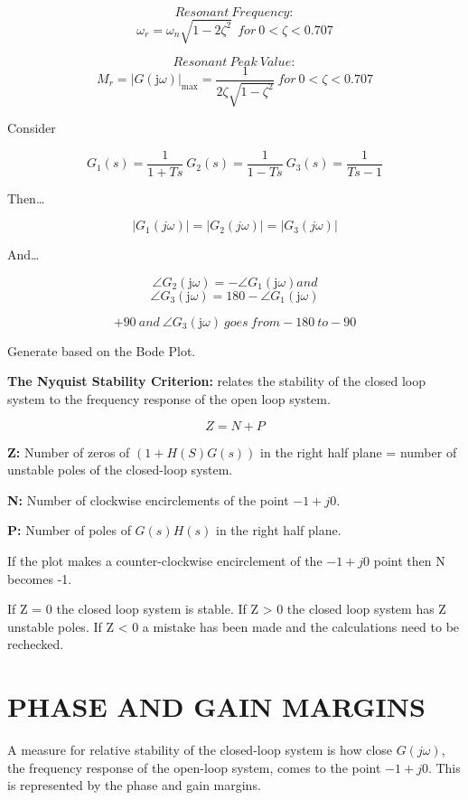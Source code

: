 \documentclass{report}
\theoremstyle{plain}
\theoremstyle{definition}
\theoremstyle{remark}
\begin{document}
\[Resonant\ Frequency:\]
\[\omega_{r} = \omega_{n}\sqrt{1 - 2\zeta^{2}}\ \ for\ 0 < \zeta < 0.707\]

\[Resonant\ Peak\ Value:\]
\[M_{r} = \left| G\left( \text{j}\omega \right) \right|_{\max} = \frac{1}{2\zeta\sqrt{1 - \zeta^{2}}} \ for\ 0 < \zeta < 0.707 \]

Consider

\[ G_{1}\left( s \right) = \frac{1}{1 + Ts} \ G_{2}\left( s \right) = \frac{1}{1 - Ts} \ G_{3}\left( s \right) = \frac{1}{Ts - 1} \]

Then\ldots{}

\[\left| G_{1}(j\omega) \right| = \left| G_{2}(j\omega) \right| = \left| G_{3}(j\omega) \right|\]

And\ldots{}

\[\angle G_{2}\left( \text{j}\omega \right) = - \angle G_{1}\left( \text{j}\omega \right) and \]
\[ \angle G_{3}\left( \text{j}\omega \right) = 180 - \angle G_{1}\left( \text{j}\omega \right)\]

\[+ 90\ and\ \angle G_{3}\left( \text{j}\omega \right)\ goes\ from - 180\ to - 90\]


Generate based on the Bode Plot.

\textbf{The Nyquist Stability Criterion:} relates the stability of the
closed loop system to the frequency response of the open loop system.

\[Z = N + P\]

\textbf{Z:} Number of zeros of $(1+H(S)G(s))$ in the right half plane =
number of unstable poles of the closed-loop system.

\textbf{N:} Number of clockwise encirclements of the point $-1+j0$.

\textbf{P:} Number of poles of $G(s)H(s)$ in the right half plane.

If the plot makes a counter-clockwise encirclement of the $-1+j0$ point
then N becomes -1.

If Z = 0 the closed loop system is stable. If Z \textgreater{} 0 the
closed loop system has Z unstable poles. If Z \textless{} 0 a mistake
has been made and the calculations need to be rechecked.

\section{PHASE AND GAIN MARGINS}

A measure for relative stability of the closed-loop system is how close
\(G(j\omega)\), the frequency response of the open-loop system, comes to
the point $-1+j0$. This is represented by the phase and gain margins.
\end{document}
